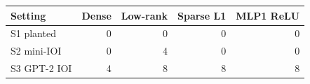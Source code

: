 \begin{tabular}{lrrrr}
\toprule
Setting & Dense & Low-rank & Sparse L1 & MLP1 ReLU \\
\midrule
S1 planted & 0 & 0 & 0 & 0 \\
S2 mini-IOI & 0 & 4 & 0 & 0 \\
S3 GPT-2 IOI & 4 & 8 & 8 & 8 \\
\bottomrule
\end{tabular}
